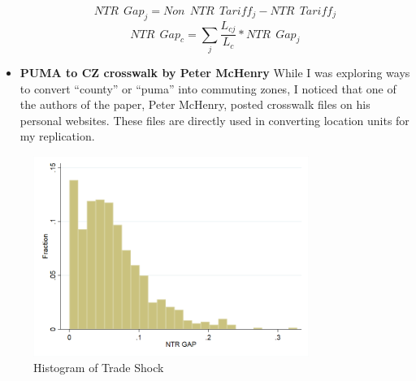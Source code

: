 \documentclass[12pt, final]{CSP}
\begin{document}
\begin{itemize}
\newline
\newline
    \begin{equation}
        NTR\: \: Gap_j=Non\: \:NTR\: \: Tariff_j - NTR\: \: Tariff_j
    \end{equation}
    \begin{equation}
        NTR\: \: Gap_c=\sum_{j} \frac{L_{cj}}{L_c}*NTR\: \: Gap_j
\end{equation}
\newline
\item \textbf{PUMA to CZ crosswalk by Peter McHenry}
\newline
\newline
While I was exploring ways to convert “county” or “puma” into commuting zones, I noticed that one of the authors of the paper, Peter McHenry, posted crosswalk files on his personal websites. These files are directly used in converting location units for my replication.
\newline
\end{itemize}

\begin{figure}[h]
\caption{Histogram of Trade Shock}
\centering
\includegraphics[width=0.8\textwidth]{Figure_A1.png}
\end{figure}
\end{document}
